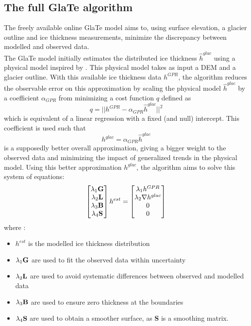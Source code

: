 \documentclass[a4, 12pt]{article}
\newcommand{\citeg}[1]{\citep[e.g.][]{#1}}
\begin{document}
\subsection{The full GlaTe algorithm}
The freely available online GlaTe model \citeg{langhammer2019glacier} aims to, using surface elevation, a glacier outline and ice thickness measurements, minimize the discrepancy between modelled and observed data.
\\
The GlaTe model initially estimates the distributed ice thickness $\hat{h}^{glac}$ using a physical model inspired by \citet{clarke2013ice}. This physical model takes as input a DEM and a glacier outline. With this available ice thickness data $h^{GPR}$, the algorithm reduces the observable error on this approximation by scaling the physical model $\hat{h}^{glac}$ by a coefficient $\alpha_{GPR}$ from  minimizing a cost function $q$ defined as
\begin{equation}
q = ||h^{GPR} - \alpha_{GPR}\hat{h}^{glac}||^2
\label{eq:cost_function}
\end{equation}
which is equivalent of a linear regression with a fixed (and null) intercept. This coefficient is used such that
\begin{equation}
h^{glac} = \alpha_{GPR}\hat{h}^{glac}
\label{eq:hglac}
\end{equation}
is a supposedly better overall approximation, giving a bigger weight to the observed data and minimizing the impact of generalized trends in the physical model.
Using this better approximation $h^{glac}$, the algorithm aims to solve this system of equations:
\begin{equation}
\begin{bmatrix} \lambda_1 \textrm{\textbf{G}}\\ \lambda_2 \textrm{\textbf{L}}\\ \lambda_3 \textrm{\textbf{B}}\\ \lambda_4 \textrm{\textbf{S}}\\ \end{bmatrix}
h^{est} = 
\begin{bmatrix} \lambda_1 h^{GPR}\\ \lambda_2 \nabla h^{glac} \\ 0 \\ 0 \end{bmatrix}
\end{equation}
where :
\begin{itemize}
\item $h^{est}$ is the modelled ice thickness distribution
\item $\lambda_1 \textrm{\textbf{G}}$ are used to fit the observed data within uncertainty
\item $\lambda_2 \textrm{\textbf{L}}$ are used to avoid systematic differences between observed and modelled data
\item $\lambda_3 \textrm{\textbf{B}}$ are used to ensure zero thickness at the boundaries
\item $\lambda_4 \textrm{\textbf{S}}$ are used to obtain a smoother surface, as \textbf{S} is a smoothing matrix.
\end{itemize}
\end{document}
